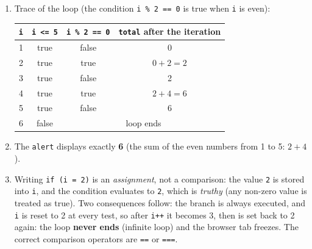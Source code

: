 \documentclass[11pt]{article}
\begin{document}
\begin{corrige}
\begin{enumerate}
\item Trace of the loop (the condition \texttt{i \% 2 == 0} is true when \texttt{i} is even):
\begin{center}
\begin{tabular}{|c|c|c|c|}\hline
\rowcolor{popblueL} \textbf{\texttt{i}} & \textbf{\texttt{i <= 5}} & \textbf{\texttt{i \% 2 == 0}} & \textbf{\texttt{total} after the iteration} \\ \hline
1 & true & false & 0 \\ \hline
2 & true & true & $0+2=2$ \\ \hline
3 & true & false & 2 \\ \hline
4 & true & true & $2+4=6$ \\ \hline
5 & true & false & 6 \\ \hline
6 & false & \multicolumn{2}{c|}{loop ends} \\ \hline
\end{tabular}
\end{center}
\item The \texttt{alert} displays exactly \textbf{6} (the sum of the even numbers from 1 to 5: $2+4$).
\item Writing \texttt{if (i = 2)} is an \emph{assignment}, not a comparison: the value \texttt{2} is stored into \texttt{i}, and the condition evaluates to \texttt{2}, which is \emph{truthy} (any non-zero value is treated as true). Two consequences follow: the branch is always executed, and \texttt{i} is reset to 2 at every test, so after \texttt{i++} it becomes 3, then is set back to 2 again: the loop \textbf{never ends} (infinite loop) and the browser tab freezes. The correct comparison operators are \texttt{==} or \texttt{===}.
\end{enumerate}
\end{corrige}
\end{document}
